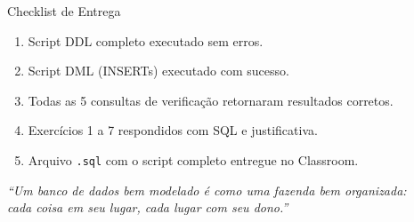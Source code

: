 \documentclass[12pt]{article}
\begin{document}
\vspace{0.8cm}

\begin{block}{Checklist de Entrega}
\begin{enumerate}
  \item[$\square$] Script DDL completo executado sem erros.
  \item[$\square$] Script DML (INSERTs) executado com sucesso.
  \item[$\square\;$] Todas as 5 consultas de verificação retornaram resultados corretos.
  \item[$\square$] Exercícios 1 a 7 respondidos com SQL e justificativa.
  \item[$\square$] Arquivo \texttt{.sql} com o script completo entregue no Classroom.
\end{enumerate}
\end{block}

\vspace{0.8cm}
\begin{center}
  \textit{``Um banco de dados bem modelado é como uma fazenda bem organizada:\\
   cada coisa em seu lugar, cada lugar com seu dono.''}
\end{center}
\end{document}
